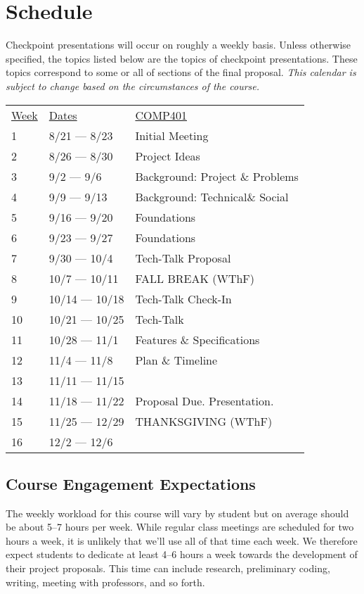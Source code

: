 \documentclass[10pt]{article}
\begin{document}
\section{Schedule}


 Checkpoint presentations will occur on roughly a weekly basis. Unless otherwise specified, the topics listed below are the topics of checkpoint presentations. These topics correspond to some or all of sections of the final proposal. \textit{This calendar is subject to change based on the circumstances of the course.}

\begin{center}
\begin{tabular}{lll}
\underline{Week} & \underline{Dates} &  \underline{COMP401} \\
1 & 8/21 --- 8/23 & Initial Meeting   \\
2 & 8/26 --- 8/30 & Project Ideas   \\
3 & 9/2 --- 9/6 & Background: Project \& Problems   \\
4 & 9/9 --- 9/13 & Background: Technical\& Social    \\
5 & 9/16 --- 9/20 & Foundations  \\
6 & 9/23 --- 9/27 & Foundations   \\
7 & 9/30 --- 10/4 & Tech-Talk Proposal  \\
8 & 10/7 --- 10/11 & FALL BREAK (WThF)  \\
9 & 10/14 --- 10/18 & Tech-Talk Check-In   \\
10 & 10/21 --- 10/25 & Tech-Talk  \\
11 & 10/28 --- 11/1 &  Features \& Specifications   \\
12 & 11/4 --- 11/8 & Plan \& Timeline  \\
13 & 11/11 --- 11/15 &   \\
14 & 11/18 --- 11/22  &  Proposal Due. Presentation. \\
15 & 11/25 --- 12/29 & THANKSGIVING (WThF)   \\
16 & 12/2 --- 12/6 &  \\
\end{tabular}
\end{center}


\subsection{Course Engagement Expectations}

The weekly workload for this course will vary by student but on average should be about 5--7 hours per week.  While regular class meetings are scheduled for two hours a week, it is unlikely that we'll use all of that time each week.  We therefore expect students to dedicate at least 4--6 hours a week towards the development of their project proposals.  This time can include research, preliminary coding, writing, meeting with professors, and so forth.
\end{document}
